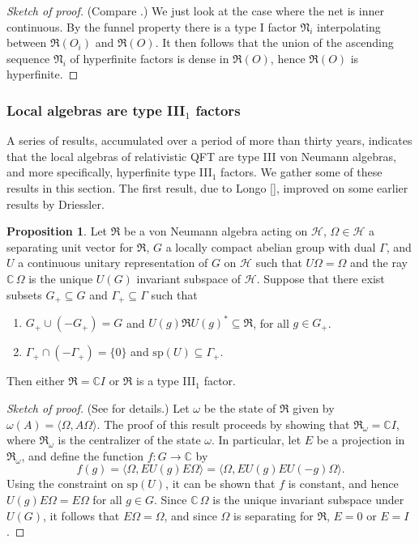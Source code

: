 \documentclass[11pt]{article}
\newcommand{\alg}[1]{\mathfrak{#1}}
\theoremstyle{definition}
\newtheorem{prop}[thm]{Proposition}
\theoremstyle{definition}
\theoremstyle{remark}
\def\2#1{{\mathcal #1}}
\def\7#1{{\mathbb #1}}
\def\al#1{{\mathfrak #1}}
\def\om{\omega} \def\Om{\Omega} \def\dd{\partial} \def\D{\Delta}
\def\G{\Gamma}
\begin{document}
\begin{proof}[Sketch of proof] (Compare \cite[p.\ 134]{typeIII}.) We
  just look at the case where the net is inner continuous.  By the
  funnel property there is a type I factor $\alg{N}_i$ interpolating
  between $\alg{R}(O_i)$ and $\alg{R}(O)$.  It then follows that the
  union of the ascending sequence $\alg{N}_i$ of hyperfinite factors
  is dense in $\alg{R}(O)$, hence $\alg{R}(O)$ is hyperfinite.
\end{proof}

\subsubsection{Local algebras are type III$_1$ factors}

A series of results, accumulated over a period of more than thirty
years, indicates that the local algebras of relativistic QFT are type
III von Neumann algebras, and more specifically, hyperfinite type
III$_1$ factors.  We gather some of these results in this section.
The first result, due to Longo [\citeyear{lon}], improved on some
earlier results by Driessler.

\begin{prop} Let $\al R$ be a von Neumann algebra acting on $\2H$,
  $\Om \in \2H$ a separating unit vector for $\al R$, $G$ a locally
  compact abelian group with dual $\G$, and $U$ a continuous unitary
  representation of $G$ on $\2H$ such that $U\Om =\Om$ and the ray
  $\7C\, \Om$ is the unique $U(G)$ invariant subspace of $\2H$.
  Suppose that there exist subsets $G_+\subseteq G$ and $\G
  _+\subseteq \G$ such that
\begin{enumerate}
\item $G_+\cup (-G_+)=G$ and $U(g)\al RU(g)^*\subseteq \al R$, for all
  $g\in G_+$.
\item $\G _+\cap (-\G _+)=\{ 0\}$ and $\mathrm{sp}(U)\subseteq \G _+$.
\end{enumerate}
Then either $\al R=\7C I$ or $\al R$ is a type III$_1$ factor. \label{half-sided}
\end{prop}

\begin{proof}[Sketch of proof] (See \cite[p.\ 203]{lon} for details.)
  Let $\om$ be the state of $\al R$ given by $\om (A)=\langle \Om
  ,A\Om \rangle $.  The proof of this result proceeds by showing that
  $\al R_\om =\7C I$, where $\al R_\om$ is the centralizer of the
  state $\om$.  In particular, let $E$ be a projection in $\al R_\om$,
  and define the function $f:G\to \7C$ by
  $$ f(g)=\langle \Om ,EU(g)E\Om \rangle =\langle \Om ,EU(g)EU(-g)\Om
  \rangle .$$ Using the constraint on $\mathrm{sp}(U)$, it can be
  shown that $f$ is constant, and hence $U(g)E\Om =E\Om$ for all $g\in
  G$.  Since $\7C \,\Om$ is the unique invariant subspace under
  $U(G)$, it follows that $E\Om =\Om$, and since $\Om$ is separating
  for $\al R$, $E=0$ or $E=I$.
\end{proof}
\end{document}
